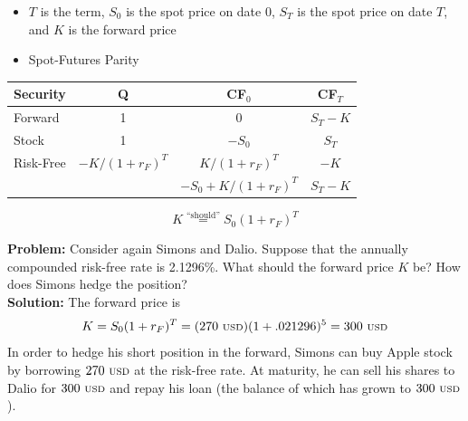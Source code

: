 \documentclass{beamer}
\begin{document}
\begin{frame}{}
\begin{itemize}
	\item $T$ is the term, $S_{0}$ is the spot price on date $0$, $S_{T}$ is the spot price on date $T$, and $K$ is the forward price
    \item Spot-Futures Parity 
\end{itemize}
    \begin{center}
        \begin{tabular}{lccc}
            Security & Q & CF$_{0}$ & CF$_{T}$ \\ \hline
            Forward & 1 & 0 & $S_{T}-K$ \\ \hline\hline
            Stock & 1 & $-S_{0}$ & $S_{T}$ \\
			Risk-Free & $-K/(1+r_{F})^{T}$ & $K/(1+r_{F})^{T}$ & $-K$ \\ \hline
			& & $-S_{0}+K/(1+r_{F})^{T}$ & $S_{T}-K$
        \end{tabular}
    \end{center}
	\begin{equation}
		\boxed{K\overset{\text{``should''}}{=}S_{0}(1+r_{F})^{T}}
	\end{equation}
\end{frame}

\begin{frame}{}
	\textbf{Problem:} Consider again Simons and Dalio. Suppose that the annually compounded risk-free rate is 2.1296\%. What should the forward price $K$ be? How does Simons hedge the position?\\
\vfill
 \textbf{Solution:} The forward price is
	\begin{equation}
		K=S_{0}(1+r_{F})^{T}=(270\text{ {\scriptsize USD}})(1+.021296)^{5}=300\text{ {\scriptsize USD}}
	\end{equation}
	In order to hedge his short position in the forward, Simons can buy Apple stock by borrowing $270\text{ {\scriptsize USD}}$ at the risk-free rate. At maturity, he can sell his shares to Dalio for $300\text{ {\scriptsize USD}}$ and repay his loan (the balance of which has grown to $300\text{ {\scriptsize USD}}$).
\end{frame}
\end{document}
